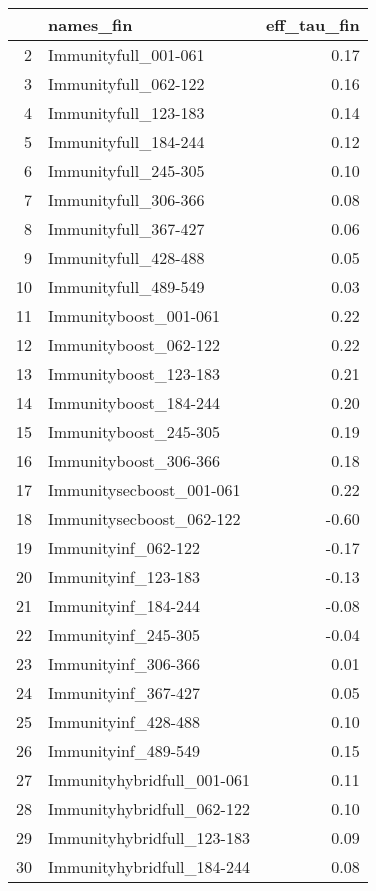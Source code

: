 \begin{table}[ht]
\centering
\begin{tabular}{rlr}
  \hline
 & names\_fin & eff\_tau\_fin \\ 
  \hline
2 & Immunityfull\_001-061 & 0.17 \\ 
  3 & Immunityfull\_062-122 & 0.16 \\ 
  4 & Immunityfull\_123-183 & 0.14 \\ 
  5 & Immunityfull\_184-244 & 0.12 \\ 
  6 & Immunityfull\_245-305 & 0.10 \\ 
  7 & Immunityfull\_306-366 & 0.08 \\ 
  8 & Immunityfull\_367-427 & 0.06 \\ 
  9 & Immunityfull\_428-488 & 0.05 \\ 
  10 & Immunityfull\_489-549 & 0.03 \\ 
  11 & Immunityboost\_001-061 & 0.22 \\ 
  12 & Immunityboost\_062-122 & 0.22 \\ 
  13 & Immunityboost\_123-183 & 0.21 \\ 
  14 & Immunityboost\_184-244 & 0.20 \\ 
  15 & Immunityboost\_245-305 & 0.19 \\ 
  16 & Immunityboost\_306-366 & 0.18 \\ 
  17 & Immunitysecboost\_001-061 & 0.22 \\ 
  18 & Immunitysecboost\_062-122 & -0.60 \\ 
  19 & Immunityinf\_062-122 & -0.17 \\ 
  20 & Immunityinf\_123-183 & -0.13 \\ 
  21 & Immunityinf\_184-244 & -0.08 \\ 
  22 & Immunityinf\_245-305 & -0.04 \\ 
  23 & Immunityinf\_306-366 & 0.01 \\ 
  24 & Immunityinf\_367-427 & 0.05 \\ 
  25 & Immunityinf\_428-488 & 0.10 \\ 
  26 & Immunityinf\_489-549 & 0.15 \\ 
  27 & Immunityhybridfull\_001-061 & 0.11 \\ 
  28 & Immunityhybridfull\_062-122 & 0.10 \\ 
  29 & Immunityhybridfull\_123-183 & 0.09 \\ 
  30 & Immunityhybridfull\_184-244 & 0.08 \\ 

\end{tabular}
\end{table}
